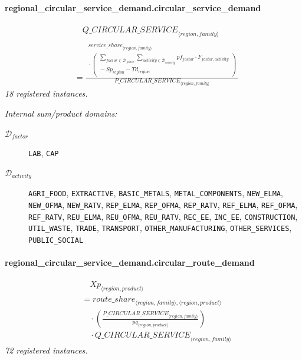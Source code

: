 \documentclass[11pt]{article}
\begin{document}
\paragraph{regional\_circular\_service\_demand.circular\_service\_demand}
\begin{align*}
&\quad {Q\_CIRCULAR\_SERVICE}_{\langle region, family\rangle}\\
&= \frac{\begin{aligned}
{service\_share}_{\langle region, family\rangle}\\
{}\cdot (\begin{aligned}
\sum_{factor \in \mathcal{D}_{factor}} \sum_{activity \in \mathcal{D}_{activity}} pf_{factor} \cdot F_{factor,activity}\\
{}- Sp_{region} - Td_{region}
\end{aligned})
\end{aligned}}{{P\_CIRCULAR\_SERVICE}_{\langle region, family\rangle}}
\end{align*}
\noindent\emph{18 registered instances.}\par
\noindent\emph{Internal sum/product domains:}\par
\begin{description}
\item[\(\mathcal{D}_{factor}\)] \texttt{LAB}, \texttt{CAP}
\item[\(\mathcal{D}_{activity}\)] \texttt{AGRI\_FOOD}, \texttt{EXTRACTIVE}, \texttt{BASIC\_METALS}, \texttt{METAL\_COMPONENTS}, \texttt{NEW\_ELMA}, \texttt{NEW\_OFMA}, \texttt{NEW\_RATV}, \texttt{REP\_ELMA}, \texttt{REP\_OFMA}, \texttt{REP\_RATV}, \texttt{REF\_ELMA}, \texttt{REF\_OFMA}, \texttt{REF\_RATV}, \texttt{REU\_ELMA}, \texttt{REU\_OFMA}, \texttt{REU\_RATV}, \texttt{REC\_EE}, \texttt{INC\_EE}, \texttt{CONSTRUCTION}, \texttt{UTIL\_WASTE}, \texttt{TRADE}, \texttt{TRANSPORT}, \texttt{OTHER\_MANUFACTURING}, \texttt{OTHER\_SERVICES}, \texttt{PUBLIC\_SOCIAL}
\end{description}
\paragraph{regional\_circular\_service\_demand.circular\_route\_demand}
\begin{align*}
&\quad Xp_{\langle region, product\rangle}\\
&= {route\_share}_{\langle region, family\rangle,\langle region, product\rangle}\\
&\quad {}\cdot (\frac{{P\_CIRCULAR\_SERVICE}_{\langle region, family\rangle}}{pq_{\langle region, product\rangle}})\\
&\quad {}\cdot {Q\_CIRCULAR\_SERVICE}_{\langle region, family\rangle}
\end{align*}
\noindent\emph{72 registered instances.}\par
\end{document}
